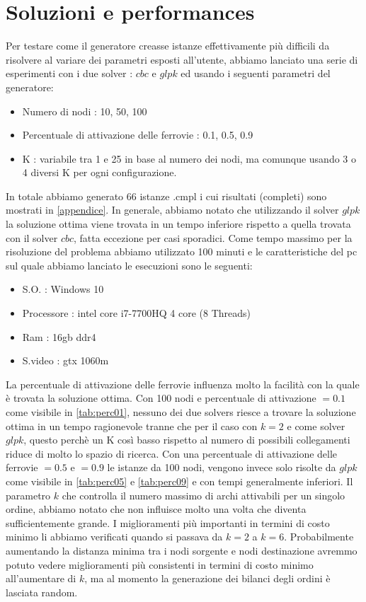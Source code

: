 \documentclass{article}
\begin{document}
\section{Soluzioni e performances}
Per testare come il generatore creasse istanze effettivamente più difficili da risolvere al variare dei parametri esposti all'utente, abbiamo lanciato una serie di esperimenti con i due solver : $cbc$ e $glpk$ ed usando i seguenti parametri del generatore:
\begin{itemize}
    \item Numero di nodi : 10, 50, 100
    \item Percentuale di attivazione delle ferrovie : 0.1, 0.5, 0.9
    \item K : variabile tra 1 e 25 in base al numero dei nodi, ma comunque usando 3 o 4 diversi K per ogni configurazione.
\end{itemize}
In totale abbiamo generato 66 istanze .cmpl i cui risultati (completi) sono mostrati in \cref{appendice}. In generale, abbiamo notato che utilizzando il solver $glpk$ la soluzione ottima viene trovata in un tempo inferiore rispetto a quella trovata con il solver $cbc$, fatta eccezione per casi sporadici. Come tempo massimo per la risoluzione del problema abbiamo utilizzato 100 minuti e le caratteristiche del pc sul quale abbiamo lanciato le esecuzioni sono le seguenti:
\begin{itemize}
    \item S.O. : Windows 10
    \item Processore : intel core i7-7700HQ 4 core (8 Threads)
    \item Ram : 16gb ddr4
    \item S.video : gtx 1060m
\end{itemize}
La percentuale di attivazione delle ferrovie influenza molto la facilità con la quale è trovata la soluzione ottima. Con 100 nodi e percentuale di attivazione $= 0.1$ come visibile in \cref{tab:perc01}, nessuno dei due solvers riesce a trovare la soluzione ottima in un tempo ragionevole tranne che per il caso con $k = 2$ e come solver $glpk$, questo perchè un K così basso rispetto al numero di possibili collegamenti riduce di molto lo spazio di ricerca. Con una percentuale di attivazione delle ferrovie $= 0.5$ e $=0.9$ le istanze da 100 nodi, vengono invece solo risolte da $glpk$ come visibile in \cref{tab:perc05} e \cref{tab:perc09} e con tempi generalmente inferiori.
Il parametro $k$ che controlla il numero massimo di archi attivabili per un singolo ordine, abbiamo notato che non influisce molto una volta che diventa sufficientemente grande. I miglioramenti più importanti in termini di costo minimo li abbiamo verificati quando si passava da $k = 2$ a $k = 6$. Probabilmente aumentando la distanza minima tra i nodi sorgente e nodi destinazione avremmo potuto vedere miglioramenti più consistenti in termini di costo minimo all'aumentare di $k$, ma al momento la generazione dei bilanci degli ordini è lasciata random.
\\
\\
\end{document}
